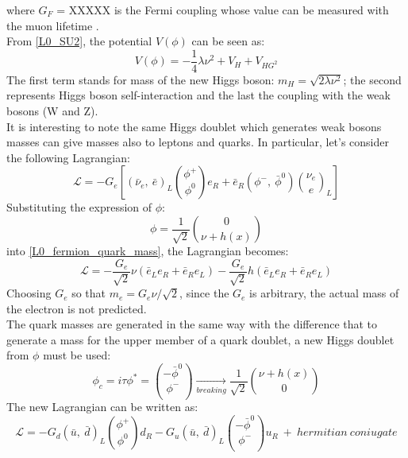 where $G_{F}$ = XXXXX is the Fermi coupling whose value can be measured with the muon lifetime \cite{muLifetime}.\\
From \ref{L0_SU2}, the potential $V(\phi)$ can be seen as:
\begin{equation}
V(\phi)=-\frac{1}{4}\lambda\nu^{2}+V_{H}+V_{HG^{2}}
\label{V0_Higgs}
\end{equation}
The first term stands for mass of the new Higgs boson: $m_{H} = \sqrt{2\lambda\nu^{2}}$; the second represents Higgs boson self-interaction and the last the coupling with the weak bosons (W and Z). \\
It is interesting to note the same Higgs doublet which generates weak bosons masses can give masses also to leptons and quarks. In particular, let's consider the following Lagrangian:
\begin{equation}
\mathcal{L} = -G_{e} [(\bar{\nu}_{e},\ \bar{e})_{L}{\phi^{+} \choose \phi^{0}}e_{R}+\bar{e}_{R}(\phi^{-},\ \bar{\phi}^{0}){\nu_{e} \choose e}_{L} ]
\label{L0_fermion_quark_mass}
\end{equation}
Substituting the expression of $\phi$:
\begin{equation}
\phi = \frac{1}{\sqrt{2}}{0 \choose \nu+h(x)}
\end{equation}
into \ref{L0_fermion_quark_mass}, the Lagrangian becomes:
\begin{equation}
\mathcal{L} = -\frac{G_{e}}{\sqrt{2}}\nu(\bar{e}_{L}e_{R}+\bar{e}_{R}e_{L})-\frac{G_{e}}{\sqrt{2}}h(\bar{e}_{L}e_{R}+\bar{e}_{R}e_{L})
\label{L0_fermion_quark_mass_2}
\end{equation}
Choosing $G_{e}$ so that $m_{e} = G_{e}\nu/\sqrt{2}$, since the $G_{e}$ is arbitrary, the actual mass of the electron is not predicted. \\
The quark masses are generated in the same way with the difference that to generate a mass for the upper member of a quark doublet, a new Higgs doublet from $\phi$ must be used:
\begin{equation}
\phi_{c} = i\tau\phi^{*}={-\bar{\phi}^{0} \choose \phi^{-}} \xrightarrow[breaking]{}\frac{1}{\sqrt{2}}{\nu+h(x) \choose 0}
\end{equation}
The new Lagrangian can be written as:
\begin{equation}
\mathcal{L}= -G_{d}(\bar{u}, \ \bar{d})_{L}{\phi^{+} \choose \phi^{0}}d_{R}-G_{u}(\bar{u}, \ \bar{d})_{L}{-\bar{\phi}^{0} \choose \phi^{-}}u_{R}\ +\ hermitian\  coniugate
\label{L0_quark_mass}
\end{equation}
